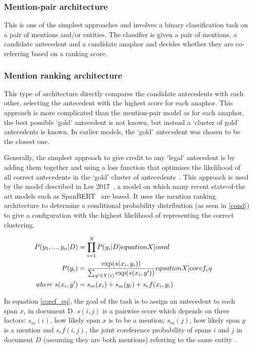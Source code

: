 \subsubsection{Mention-pair architecture} 
This is one of the simplest approaches and involves a binary classification task on a pair of mentions and/or entities. The classifier is given a pair of mentions, a candidate antecedent and a candidate anaphor and decides whether they are co-referring based on a ranking score. 

\subsubsection{Mention ranking architecture}

This type of architecture directly compares the candidate antecedents with each other,  selecting the antecedent with the highest score for each anaphor. This approach is more complicated than the mention-pair model as for each anaphor, the best possible `gold' antecedent is not known, but instead a `cluster of gold' antecedents is known. In earlier models, the `gold' antecedent was chosen to be the closest one. 

Generally, the simplest approach to give credit to any `legal' antecedent is by adding them together and using a loss function that optimises the likelihood of all correct antecedents in the `gold' cluster of antecedents~\cite{stanfordcoref}. This approach is used by the model described in Lee 2017~\cite{lee2017end}, a model on which many recent state-of-the art models such as SpanBERT~\cite{spanBERT} are based. It uses the mention ranking architecture to determine a conditional probability distribution (as seen in \cref{cond}) to give a configuration with the highest likelihood of representing the correct clustering. 

\begin{align}
 P(y_1, ..., y_n | D)  &= \prod_{i=1}^{N} P(y_i | D) \label[equationX]{cond} &\\
 P(y_i) &= \frac{\exp(s(x_i, y_i))}{\sum_{y' \in Y(i)} \exp(s(x_i,y'))}  \label[equationX]{coref_eq} &\\
\mathit{where} \ s(x_i,y')  &= s_m (x_i) +  s_m (y_i)  +  s_cf(x_i, y_i) \nonumber
\end{align}

In equation \cref{coref_eq}, the goal of the task is to assign an antecedent to each span $x_i$ in document D. \( s(i,j)\) is a pairwise score which depends on three factors:  \(s_m(i)\), how likely span $x$ is to be a mention; \(s_m(j)\), how likely span $y$ is a mention and \(s_cf(i, j)\), the joint coreference probability of spans $i$ and $j$  in document $D$ (assuming they are both mentions) referring to the same entity \cite{lee2017end}\cite{lee2018coursetofine}.

